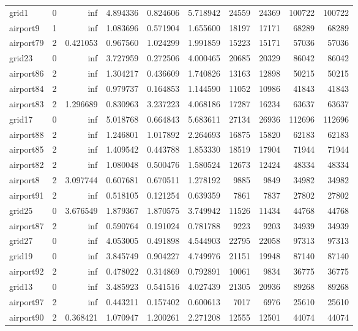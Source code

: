 \begin{longtable}{|l|r|r|r|r|r|r|r|r|r|}
grid1 & 0 & inf & 4.894336 & 0.824606 & 5.718942 & 24559 & 24369 & 100722 & 100722 \\
airport9 & 1 & inf & 1.083696 & 0.571904 & 1.655600 & 18197 & 17171 & 68289 & 68289 \\
airport79 & 2 & 0.421053 & 0.967560 & 1.024299 & 1.991859 & 15223 & 15171 & 57036 & 57036 \\
grid23 & 0 & inf & 3.727959 & 0.272506 & 4.000465 & 20685 & 20329 & 86042 & 86042 \\
airport86 & 2 & inf & 1.304217 & 0.436609 & 1.740826 & 13163 & 12898 & 50215 & 50215 \\
airport84 & 2 & inf & 0.979737 & 0.164853 & 1.144590 & 11052 & 10986 & 41843 & 41843 \\
airport83 & 2 & 1.296689 & 0.830963 & 3.237223 & 4.068186 & 17287 & 16234 & 63637 & 63637 \\
grid17 & 0 & inf & 5.018768 & 0.664843 & 5.683611 & 27134 & 26936 & 112696 & 112696 \\
airport88 & 2 & inf & 1.246801 & 1.017892 & 2.264693 & 16875 & 15820 & 62183 & 62183 \\
airport85 & 2 & inf & 1.409542 & 0.443788 & 1.853330 & 18519 & 17904 & 71944 & 71944 \\
airport82 & 2 & inf & 1.080048 & 0.500476 & 1.580524 & 12673 & 12424 & 48334 & 48334 \\
airport8 & 2 & 3.097744 & 0.607681 & 0.670511 & 1.278192 & 9885 & 9849 & 34982 & 34982 \\
airport91 & 2 & inf & 0.518105 & 0.121254 & 0.639359 & 7861 & 7837 & 27802 & 27802 \\
grid25 & 0 & 3.676549 & 1.879367 & 1.870575 & 3.749942 & 11526 & 11434 & 44768 & 44768 \\
airport87 & 2 & inf & 0.590764 & 0.191024 & 0.781788 & 9223 & 9203 & 34939 & 34939 \\
grid27 & 0 & inf & 4.053005 & 0.491898 & 4.544903 & 22795 & 22058 & 97313 & 97313 \\
grid19 & 0 & inf & 3.845749 & 0.904227 & 4.749976 & 21151 & 19948 & 87140 & 87140 \\
airport92 & 2 & inf & 0.478022 & 0.314869 & 0.792891 & 10061 & 9834 & 36775 & 36775 \\
grid13 & 0 & inf & 3.485923 & 0.541516 & 4.027439 & 21305 & 20936 & 89268 & 89268 \\
airport97 & 2 & inf & 0.443211 & 0.157402 & 0.600613 & 7017 & 6976 & 25610 & 25610 \\
airport90 & 2 & 0.368421 & 1.070947 & 1.200261 & 2.271208 & 12555 & 12501 & 44074 & 44074 \\

\end{longtable}

